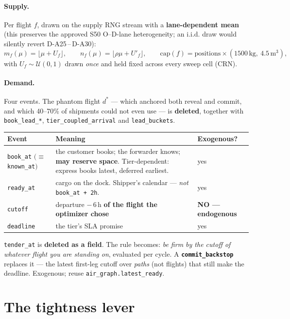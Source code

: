 \documentclass[11pt,a4paper]{article}
\newcommand{\src}[1]{\texttt{\small #1}}
\begin{document}
\paragraph{Supply.} Per flight $f$, drawn on the supply RNG stream with a \textbf{lane-dependent mean}
(this preserves the approved S50 O--D-lane heterogeneity; an i.i.d. draw would silently revert
D-A25\,--\,D-A30):
\[
m_f(\mu) = \big\lfloor \mu + U_f \big\rfloor, \qquad
n_f(\mu) = \big\lfloor \rho\mu + U'_f \big\rfloor, \qquad
\text{cap}(f) = \text{positions} \times (1500\,\text{kg},\ 4.5\,\text{m}^3),
\]
with $U_f \sim \mathcal{U}(0,1)$ drawn \emph{once} and held fixed across every sweep cell (CRN).

\paragraph{Demand.} Four events. The phantom flight $d^{*}$ --- which anchored both reveal and commit, and
which 40--70\% of shipments could not even use --- is \textbf{deleted}, together with
\src{book\_lead\_*}, \src{tier\_coupled\_arrival} and \src{lead\_buckets}.

\begin{center}
\begin{tabularx}{\textwidth}{@{}lLl@{}}
\toprule
\textbf{Event} & \textbf{Meaning} & \textbf{Exogenous?} \\
\midrule
\src{book\_at} $(\equiv$ \src{known\_at}$)$ & the customer books; the forwarder knows; \textbf{may reserve
space}. Tier-dependent: express books latest, deferred earliest. & yes \\
\src{ready\_at} & cargo on the dock. Shipper's calendar --- \emph{not} \src{book\_at + 2h}. & yes \\
\src{cutoff} & departure $-\,6$\,h \textbf{of the flight the optimizer chose} & \textbf{NO --- endogenous} \\
\src{deadline} & the tier's SLA promise & yes \\
\bottomrule
\end{tabularx}
\end{center}

\src{tender\_at} is \textbf{deleted as a field}. The rule becomes: \emph{be firm by the cutoff of whatever
flight you are standing on}, evaluated per cycle. A \textbf{\src{commit\_backstop}} replaces it --- the
latest first-leg cutoff over \emph{paths} (not flights) that still make the deadline. Exogenous; reuse
\src{air\_graph.latest\_ready}.

\section{The tightness lever}
\end{document}
